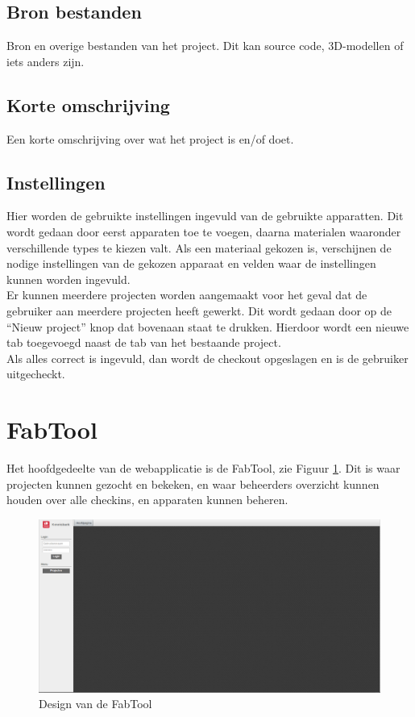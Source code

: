 \subsection{Bron bestanden}

Bron en overige bestanden van het project. Dit kan source code, 3D-modellen of iets anders zijn.

\subsection{Korte omschrijving}

Een korte omschrijving over wat het project is en/of doet.

\subsection{Instellingen}

Hier worden de gebruikte instellingen ingevuld van de gebruikte apparatten. Dit wordt gedaan door eerst apparaten toe te voegen, daarna materialen waaronder verschillende types te kiezen valt. Als een materiaal gekozen is, verschijnen de nodige instellingen van de gekozen apparaat en velden waar de instellingen kunnen worden ingevuld. \\

Er kunnen meerdere projecten worden aangemaakt voor het geval dat de gebruiker aan meerdere projecten heeft gewerkt. Dit wordt gedaan door op de ``Nieuw project'' knop dat bovenaan staat te drukken. Hierdoor wordt een nieuwe tab toegevoegd naast de tab van het bestaande project. \\
Als alles correct is ingevuld, dan wordt de checkout opgeslagen en is de gebruiker uitgecheckt.

\section{FabTool}

Het hoofdgedeelte van de webapplicatie is de FabTool, zie Figuur \ref{fig:fabtool}. Dit is waar projecten kunnen gezocht en bekeken, en waar beheerders overzicht kunnen houden over alle checkins, en apparaten kunnen beheren.

\begin{figure}[Hh]
	\centering
	\includegraphics[width=1\textwidth]{Images/fabtool.png}
	\caption{Design van de FabTool}
	\label{fig:fabtool}
\end{figure}

